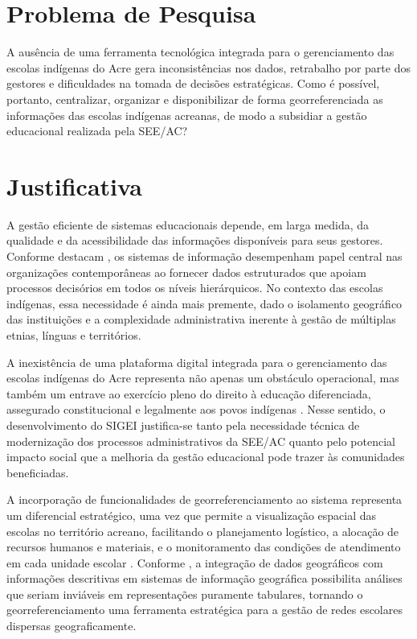 \documentclass[12pt,a4paper,oneside]{abntspiifac}
\begin{document}
\section{Problema de Pesquisa}

A ausência de uma ferramenta tecnológica integrada para o gerenciamento das escolas indígenas do Acre gera inconsistências nos dados, retrabalho por parte dos gestores e dificuldades na tomada de decisões estratégicas. Como é possível, portanto, centralizar, organizar e disponibilizar de forma georreferenciada as informações das escolas indígenas acreanas, de modo a subsidiar a gestão educacional realizada pela SEE/AC?

\section{Justificativa}
\label{sec:justificativa}

A gestão eficiente de sistemas educacionais depende, em larga medida, da qualidade e da acessibilidade das informações disponíveis para seus gestores. Conforme destacam , os sistemas de informação desempenham papel central nas organizações contemporâneas ao fornecer dados estruturados que apoiam processos decisórios em todos os níveis hierárquicos. No contexto das escolas indígenas, essa necessidade é ainda mais premente, dado o isolamento geográfico das instituições e a complexidade administrativa inerente à gestão de múltiplas etnias, línguas e territórios.

A inexistência de uma plataforma digital integrada para o gerenciamento das escolas indígenas do Acre representa não apenas um obstáculo operacional, mas também um entrave ao exercício pleno do direito à educação diferenciada, assegurado constitucional e legalmente aos povos indígenas \cite{brasil1988}. Nesse sentido, o desenvolvimento do SIGEI justifica-se tanto pela necessidade técnica de modernização dos processos administrativos da SEE/AC quanto pelo potencial impacto social que a melhoria da gestão educacional pode trazer às comunidades beneficiadas.

A incorporação de funcionalidades de georreferenciamento ao sistema representa um diferencial estratégico, uma vez que permite a visualização espacial das escolas no território acreano, facilitando o planejamento logístico, a alocação de recursos humanos e materiais, e o monitoramento das condições de atendimento em cada unidade escolar \cite{longley2013}. Conforme , a integração de dados geográficos com informações descritivas em sistemas de informação geográfica possibilita análises que seriam inviáveis em representações puramente tabulares, tornando o georreferenciamento uma ferramenta estratégica para a gestão de redes escolares dispersas geograficamente.
\end{document}
